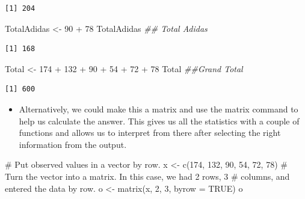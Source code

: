 \documentclass[
  letterpaper,
  DIV=11,
  numbers=noendperiod]{scrreprt}
\newenvironment{Shaded}{\begin{snugshade}}{\end{snugshade}}
\newcommand{\AttributeTok}[1]{\textcolor[rgb]{0.40,0.45,0.13}{#1}}
\newcommand{\CommentTok}[1]{\textcolor[rgb]{0.37,0.37,0.37}{#1}}
\newcommand{\ConstantTok}[1]{\textcolor[rgb]{0.56,0.35,0.01}{#1}}
\newcommand{\DecValTok}[1]{\textcolor[rgb]{0.68,0.00,0.00}{#1}}
\newcommand{\DocumentationTok}[1]{\textcolor[rgb]{0.37,0.37,0.37}{\textit{#1}}}
\newcommand{\FunctionTok}[1]{\textcolor[rgb]{0.28,0.35,0.67}{#1}}
\newcommand{\NormalTok}[1]{\textcolor[rgb]{0.00,0.23,0.31}{#1}}
\newcommand{\OtherTok}[1]{\textcolor[rgb]{0.00,0.23,0.31}{#1}}
\newcommand{\SpecialCharTok}[1]{\textcolor[rgb]{0.37,0.37,0.37}{#1}}
\providecommand{\tightlist}{%
  \setlength{\itemsep}{0pt}\setlength{\parskip}{0pt}}\usepackage{longtable,booktabs,array}
\begin{document}
\begin{verbatim}
[1] 204
\end{verbatim}

\begin{Shaded}
\begin{Highlighting}[]
\NormalTok{TotalAdidas }\OtherTok{\textless{}{-}} \DecValTok{90} \SpecialCharTok{+} \DecValTok{78}
\NormalTok{TotalAdidas  }\DocumentationTok{\#\# Total Adidas}
\end{Highlighting}
\end{Shaded}

\begin{verbatim}
[1] 168
\end{verbatim}

\begin{Shaded}
\begin{Highlighting}[]
\NormalTok{Total }\OtherTok{\textless{}{-}} \DecValTok{174} \SpecialCharTok{+} \DecValTok{132} \SpecialCharTok{+} \DecValTok{90} \SpecialCharTok{+} \DecValTok{54} \SpecialCharTok{+} \DecValTok{72} \SpecialCharTok{+} \DecValTok{78}
\NormalTok{Total  }\DocumentationTok{\#\#Grand Total }
\end{Highlighting}
\end{Shaded}

\begin{verbatim}
[1] 600
\end{verbatim}

\begin{itemize}
\tightlist
\item
  Alternatively, we could make this a matrix and use the matrix command
  to help us calculate the answer. This gives us all the statistics with
  a couple of functions and allows us to interpret from there after
  selecting the right information from the output.
\end{itemize}

\begin{Shaded}
\begin{Highlighting}[]
\CommentTok{\# Put observed values in a vector by row.}
\NormalTok{x }\OtherTok{\textless{}{-}} \FunctionTok{c}\NormalTok{(}\DecValTok{174}\NormalTok{, }\DecValTok{132}\NormalTok{, }\DecValTok{90}\NormalTok{, }\DecValTok{54}\NormalTok{, }\DecValTok{72}\NormalTok{, }\DecValTok{78}\NormalTok{)}
\CommentTok{\# Turn the vector into a matrix. In this case, we had 2 rows, 3}
\CommentTok{\# columns, and entered the data by row.}
\NormalTok{o }\OtherTok{\textless{}{-}} \FunctionTok{matrix}\NormalTok{(x, }\DecValTok{2}\NormalTok{, }\DecValTok{3}\NormalTok{, }\AttributeTok{byrow =} \ConstantTok{TRUE}\NormalTok{)}
\NormalTok{o}
\end{Highlighting}
\end{Shaded}
\end{document}
